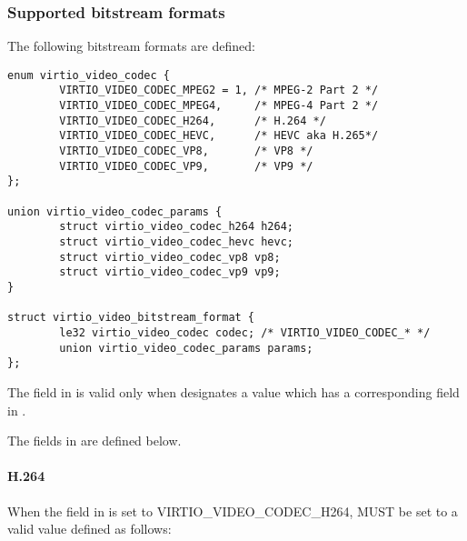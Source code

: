 \subsubsection{Supported bitstream formats}

The following bitstream formats are defined:
\begin{lstlisting}
enum virtio_video_codec {
        VIRTIO_VIDEO_CODEC_MPEG2 = 1, /* MPEG-2 Part 2 */
        VIRTIO_VIDEO_CODEC_MPEG4,     /* MPEG-4 Part 2 */
        VIRTIO_VIDEO_CODEC_H264,      /* H.264 */
        VIRTIO_VIDEO_CODEC_HEVC,      /* HEVC aka H.265*/
        VIRTIO_VIDEO_CODEC_VP8,       /* VP8 */
        VIRTIO_VIDEO_CODEC_VP9,       /* VP9 */
};

union virtio_video_codec_params {
        struct virtio_video_codec_h264 h264;
        struct virtio_video_codec_hevc hevc;
        struct virtio_video_codec_vp8 vp8;
        struct virtio_video_codec_vp9 vp9;
}

struct virtio_video_bitstream_format {
        le32 virtio_video_codec codec; /* VIRTIO_VIDEO_CODEC_* */
        union virtio_video_codec_params params;
};
\end{lstlisting}

The field  in  is
valid only when  designates a value which has a corresponding field
in .

The fields in  are defined below.

\paragraph{H.264}

When the field  in 
is set to VIRTIO_VIDEO_CODEC_H264,  MUST be set to a
valid value defined as follows:

